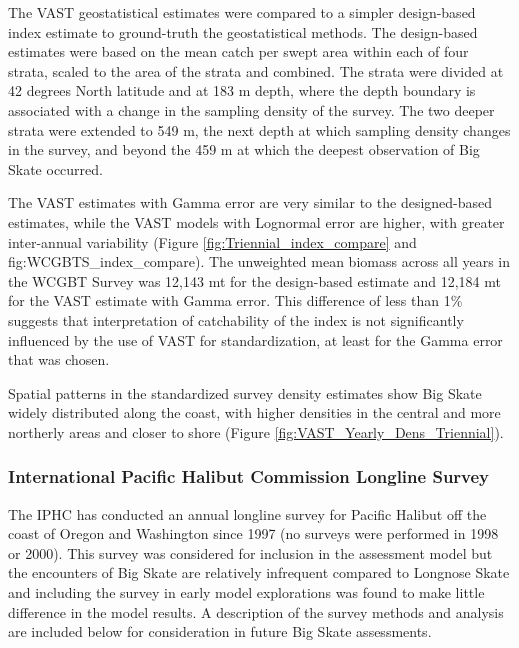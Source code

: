 \documentclass[12pt,]{article}
\begin{document}
The VAST geostatistical estimates were compared to a simpler
design-based index estimate to ground-truth the geostatistical methods.
The design-based estimates were based on the mean catch per swept area
within each of four strata, scaled to the area of the strata and
combined. The strata were divided at 42 degrees North latitude and at
183 m depth, where the depth boundary is associated with a change in the
sampling density of the survey. The two deeper strata were extended to
549 m, the next depth at which sampling density changes in the survey,
and beyond the 459 m at which the deepest observation of Big Skate
occurred.

The VAST estimates with Gamma error are very similar to the
designed-based estimates, while the VAST models with Lognormal error are
higher, with greater inter-annual variability (Figure
\ref{fig:Triennial_index_compare} and fig:WCGBTS\_index\_compare). The
unweighted mean biomass across all years in the WCGBT Survey was 12,143
mt for the design-based estimate and 12,184 mt for the VAST estimate
with Gamma error. This difference of less than 1\% suggests that
interpretation of catchability of the index is not significantly
influenced by the use of VAST for standardization, at least for the
Gamma error that was chosen.

Spatial patterns in the standardized survey density estimates show Big
Skate widely distributed along the coast, with higher densities in the
central and more northerly areas and closer to shore (Figure
\ref{fig:VAST_Yearly_Dens_Triennial}).

\hypertarget{international-pacific-halibut-commission-longline-survey}{%
\subsubsection{International Pacific Halibut Commission Longline
Survey}\label{international-pacific-halibut-commission-longline-survey}}

The IPHC has conducted an annual longline survey for Pacific Halibut off
the coast of Oregon and Washington since 1997 (no surveys were performed
in 1998 or 2000). This survey was considered for inclusion in the
assessment model but the encounters of Big Skate are relatively
infrequent compared to Longnose Skate and including the survey in early
model explorations was found to make little difference in the model
results. A description of the survey methods and analysis are included
below for consideration in future Big Skate assessments.
\end{document}
